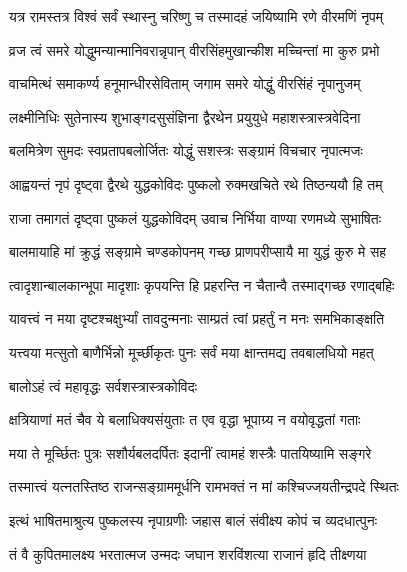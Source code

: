 \twolineshloka
{यत्र रामस्तत्र विश्वं सर्वं स्थास्नु चरिष्णु च}
{तस्मादहं जयिष्यामि रणे वीरमणिं नृपम्}%

\twolineshloka
{व्रज त्वं समरे योद्धुमन्यान्मानिवरान्नृपान्}
{वीरसिंहमुखान्कीश मच्चिन्तां मा कुरु प्रभो}%

\twolineshloka
{वाचमित्थं समाकर्ण्य हनूमान्धीरसेविताम्}
{जगाम समरे योद्धुं वीरसिंहं नृपानुजम्}%

\twolineshloka
{लक्ष्मीनिधिः सुतेनास्य शुभाङ्गदसुसंज्ञिना}
{द्वैरथेन प्रयुयुधे महाशस्त्रास्त्रवेदिना}%

\twolineshloka
{बलमित्रेण सुमदः स्वप्रतापबलोर्जितः}
{योद्धुं सशस्त्रः सङ्ग्रामं विचचार नृपात्मजः}%

\twolineshloka
{आह्वयन्तं नृपं दृष्ट्वा द्वैरथे युद्धकोविदः}
{पुष्कलो रुक्मखचिते रथे तिष्ठन्ययौ हि तम्}%

\twolineshloka
{राजा तमागतं दृष्ट्वा पुष्कलं युद्धकोविदम्}
{उवाच निर्भिया वाण्या रणमध्ये सुभाषितः}%


\twolineshloka
{बालमायाहि मां क्रुद्धं सङ्ग्रामे चण्डकोपनम्}
{गच्छ प्राणपरीप्सायै मा युद्धं कुरु मे सह}%

\twolineshloka
{त्वादृशान्बालकान्भूपा मादृशाः कृपयन्ति हि}
{प्रहरन्ति न चैतान्वै तस्माद्गच्छ रणाद्बहिः}%

\twolineshloka
{यावत्त्वं न मया दृष्टश्चक्षुर्भ्यां तावदुन्मनाः}
{साम्प्रतं त्वां प्रहर्तुं न मनः समभिकाङ्क्षति}%

\twolineshloka
{यत्त्वया मत्सुतो बाणैर्भिन्नो मूर्च्छीकृतः पुनः}
{सर्वं मया क्षान्तमद्य तवबालधियो महत्}%



\onelineshloka
{बालोऽहं त्वं महावृद्धः सर्वशस्त्रास्त्रकोविदः}%

\twolineshloka
{क्षत्रियाणां मतं चैव ये बलाधिक्यसंयुताः}
{त एव वृद्धा भूपाग्र्य न वयोवृद्धतां गताः}%

\twolineshloka
{मया ते मूर्च्छितः पुत्रः सशौर्यबलदर्पितः}
{इदानीं त्वामहं शस्त्रैः पातयिष्यामि सङ्गरे}%

\twolineshloka
{तस्मात्त्वं यत्नतस्तिष्ठ राजन्सङ्ग्राममूर्धनि}
{रामभक्तं न मां कश्चिज्जयतीन्द्रपदे स्थितः}%

\twolineshloka
{इत्थं भाषितमाश्रुत्य पुष्कलस्य नृपाग्रणीः}
{जहास बालं संवीक्ष्य कोपं च व्यदधात्पुनः}%

\twolineshloka
{तं वै कुपितमालक्ष्य भरतात्मज उन्मदः}
{जघान शरविंशत्या राजानं हृदि तीक्ष्णया}%

